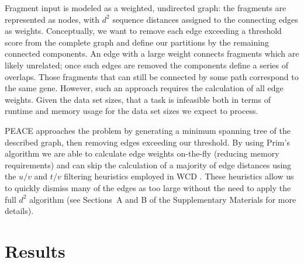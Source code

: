 \documentclass[a4,center,fleqn]{NAR}
\newcommand{\peace} {{\small PEACE}}
\newcommand{\wcd} {{\small WCD}}
\begin{document}
Fragment input is modeled as a weighted, undirected graph: the
fragments are represented as nodes, with $d^2$ sequence distances
assigned to the connecting edges as weights.  Conceptually, we want to
remove each edge exceeding a threshold score from the complete graph
and define our partitions by the remaining connected components.  An
edge with a large weight connects fragments which are likely
unrelated; once such edges are removed the components define a series
of overlaps.  Those fragments that can still be connected by some path
correspond to the same gene.  However, such an approach requires the
calculation of all edge weights.  Given the data set sizes, that a
task is infeasible both in terms of runtime and memory usage for the
data set sizes we expect to process.

\peace\/ approaches the problem by generating a minimum spanning tree of the
described graph, then removing edges exceeding our threshold.  By
using Prim's algorithm we are able to calculate edge weights
on-the-fly (reducing memory requirements) and can skip the
calculation of a majority of edge distances using the $u/v$ and $t/v$
filtering heuristics employed in \wcd\/ \cite{Hazelhurst08a}.
These heuristics allow us to quickly dismiss many of the edges as too
large without the need to apply the full $d^2$ algorithm (see
Sections~A and B of the Supplementary Materials for more details). 

\section{Results}
\end{document}

